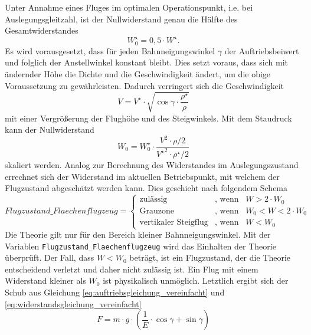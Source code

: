 Unter Annahme eines Fluges im optimalen Operationspunkt, i.e. bei Auslegungsgleitzahl, ist der Nullwiderstand genau die Hälfte des Gesamtwiderstandes \cite[S.82-S.83]{Bruning.1986}
\begin{equation}
	W_0^\star = 0,5\cdot W^\star .
\end{equation}
Es wird vorausgesetzt, dass für jeden Bahnneigungswinkel \ensuremath{\gamma} der Auftriebsbeiwert und folglich der Anstellwinkel konstant bleibt. Dies setzt voraus, dass sich mit ändernder Höhe die Dichte und die Geschwindigkeit ändert, um die obige Voraussetzung zu gewährleisten. Dadurch verringert sich die Geschwindigkeit 
\begin{equation}
	V = V^\star\cdot\sqrt{\cos\gamma\cdot\frac{\rho^\star}{\rho}}  \label{eq:geschw_flaechenflugzeug}
\end{equation}
mit einer Vergrößerung der Flughöhe und des Steigwinkels. Mit dem Staudruck kann der Nullwiderstand 
\begin{equation}
	W_0 = W_0^\star\cdot\frac{V^2\cdot\rho/2}{{V^\star}^2\cdot\rho^\star/2}
\end{equation}
skaliert werden.
Analog zur Berechnung des Widerstandes im Auslegungszustand errechnet sich der Widerstand im aktuellen Betriebspunkt, mit welchem der Flugzustand abgeschätzt werden kann. Dies geschieht nach folgendem Schema
\begin{equation}
Flugzustand\_Flaechenflugzeug = \begin{cases} 
\text{zulässig} & \text{, wenn} \;\;\; W > 2\cdot W_0 \\ 
\text{Grauzone} & \text{, wenn} \;\;\; W_0 < W < 2\cdot W_0 \\ 
\text{vertikaler Steigflug}  & \text{, wenn} \;\;\; W < W_0 
\end{cases}
\end{equation} 
Die Theorie gilt nur für den Bereich kleiner Bahnneigungswinkel. Mit der Variablen \texttt{Flugzustand\_Flaechenflugzeug} wird das Einhalten der Theorie überprüft. Der Fall, dass \ensuremath{W < W_0} beträgt, ist ein Flugzustand, der die Theorie entscheidend verletzt und daher nicht zulässig ist. Ein Flug mit einem Widerstand kleiner als \ensuremath{W_0} ist physikalisch unmöglich.
Letztlich ergibt sich der Schub aus Gleichung \ref{eq:auftriebsgleichung_vereinfacht} und \ref{eq:widerstandsgleichung_vereinfacht}
\begin{equation}
	F = m\cdot g\cdot (\frac{1}{E}\cdot\cos\gamma + \sin\gamma) \label{eq:schub_flaechenflugzeug}
\end{equation}
